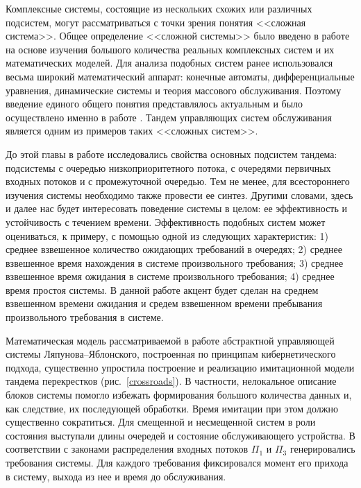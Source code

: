 Комплексные системы, состоящие из нескольких схожих или различных подсистем, могут рассматриваться с точки зрения понятия <<сложная система>>. Общее определение <<сложной системы>> было введено в работе \cite{Buslenko:1978} на основе изучения большого количества реальных комплексных систем и их математических моделей. Для анализа подобных систем ранее использовался весьма широкий математический аппарат: конечные автоматы, дифференциальные уравнения, динамические системы и теория массового обслуживания. Поэтому введение единого общего понятия представлялось актуальным и было осуществлено именно в работе \cite{Buslenko:1978}. Тандем управляющих систем обслуживания является одним из примеров таких <<сложных систем>>. 

До этой главы в работе исследовались свойства основных подсистем тандема: подсистемы с очередью низкоприоритетного потока, с очередями первичных входных потоков и с промежуточной очередью. Тем не менее, для всестороннего изучения системы необходимо также провести ее синтез. Другими словами, здесь и далее нас будет интересовать поведение системы в целом: ее эффективность и устойчивость с течением времени. Эффективность подобных систем может оцениваться, к примеру, с помощью одной из следующих характеристик: 1) среднее взвешенное количество ожидающих требований в очередях; 2) среднее взвешенное время нахождения в системе произвольного требования; 3) среднее взвешенное время ожидания в системе произвольного требования; 4) среднее время простоя системы. В данной работе акцент будет сделан на среднем взвешенном времени ожидания и средем взвешенном времени пребывания произвольного требования в системе.


Математическая модель рассматриваемой в работе абстрактной управляющей системы Ляпунова--Яблонского, построенная по принципам кибернетического подхода, существенно упростила построение и реализацию имитационной модели тандема перекрестков (рис.~\ref{crossroads}). В частности, нелокальное описание блоков системы помогло избежать формирования большого количества данных и, как следствие, их последующей обработки. Время имитации при этом должно существенно сократиться. Для смещенной и несмещенной систем в роли состояния выступали длины очередей и состояние обслуживающего устройства. В соответствии с законами распределения входных потоков  $\Pi_1$ и $\Pi_3$ генерировались требования системы. Для каждого требования фиксировался момент его прихода в систему, выхода из нее и время до обслуживания.

